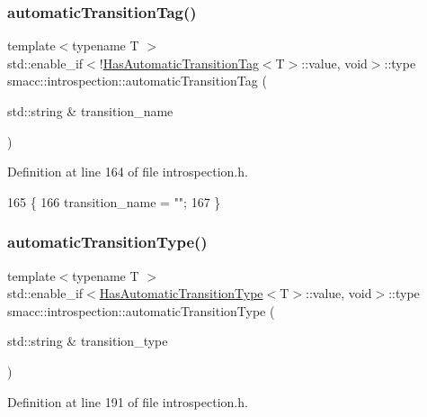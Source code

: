 \subsubsection{\texorpdfstring{automatic\+Transition\+Tag()}{automaticTransitionTag()}\hspace{0.1cm}{\footnotesize\ttfamily [2/2]}}
{\footnotesize\ttfamily template$<$typename T $>$ \\
std\+::enable\+\_\+if$<$!\hyperlink{classsmacc_1_1introspection_1_1HasAutomaticTransitionTag}{Has\+Automatic\+Transition\+Tag}$<$T$>$\+::value, void$>$\+::type smacc\+::introspection\+::automatic\+Transition\+Tag (\begin{DoxyParamCaption}\item[{std\+::string \&}]{transition\+\_\+name }\end{DoxyParamCaption})}



Definition at line 164 of file introspection.\+h.


\begin{DoxyCode}
165 \{
166     transition\_name = \textcolor{stringliteral}{""};
167 \}
\end{DoxyCode}
\mbox{\label{namespacesmacc_1_1introspection_a2afacf459b5e29bb9fe8880a2a2d2b72}} 
\subsubsection{\texorpdfstring{automatic\+Transition\+Type()}{automaticTransitionType()}\hspace{0.1cm}{\footnotesize\ttfamily [1/2]}}
{\footnotesize\ttfamily template$<$typename T $>$ \\
std\+::enable\+\_\+if$<$\hyperlink{classsmacc_1_1introspection_1_1HasAutomaticTransitionType}{Has\+Automatic\+Transition\+Type}$<$T$>$\+::value, void$>$\+::type smacc\+::introspection\+::automatic\+Transition\+Type (\begin{DoxyParamCaption}\item[{std\+::string \&}]{transition\+\_\+type }\end{DoxyParamCaption})}



Definition at line 191 of file introspection.\+h.



